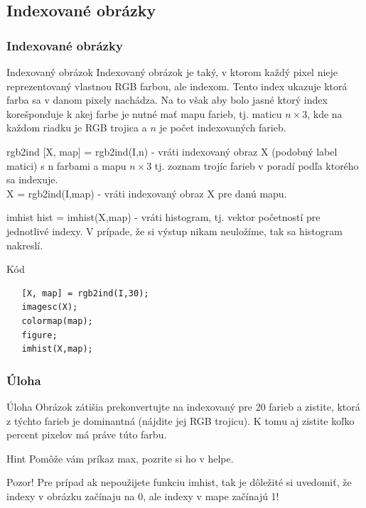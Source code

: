 \documentclass{beamer}
\begin{document}
\subsection{Indexované obrázky}
\begin{frame}[fragile]
\frametitle{Indexované obrázky}
  \begin{block}{Indexovaný obrázok}
  Indexovaný obrázok je taký, v ktorom každý pixel nieje reprezentovaný vlastnou RGB farbou, ale indexom. Tento index ukazuje ktorá farba sa v danom pixely nachádza. Na to však aby bolo jasné ktorý index korešponduje k akej farbe je nutné mať mapu farieb, tj. maticu $n \times 3$, kde na každom riadku je RGB trojica a $n$ je počet indexovaných farieb.
  \end{block} 
\end{frame}

\begin{frame}[fragile]

  \begin{block}{rgb2ind}
  [X, map] = rgb2ind(I,n) - vráti indexovaný obraz X (podobný label matici) s n farbami a mapu $n \times 3$ tj. zoznam trojíc farieb v poradí podľa ktorého sa indexuje. \\
    X = rgb2ind(I,map) - vráti indexovaný obraz X pre danú mapu.
  \end{block}   
  
  
    \begin{block}{imhist}
  hist = imhist(X,map) - vráti histogram, tj. vektor početností pre jednotlivé indexy. V prípade, že si výstup nikam neuložíme, tak sa histogram nakreslí.
  \end{block} 
  
  \begin{block}{Kód}
  \begin{verbatim}
   [X, map] = rgb2ind(I,30);
   imagesc(X);
   colormap(map);
   figure;
   imhist(X,map);\end{verbatim}
  \end{block} 
\end{frame}


\begin{frame}
\frametitle{Úloha}    
  \begin{block}{Úloha}
  Obrázok zátišia prekonvertujte na indexovaný pre 20 farieb a zistite, ktorá z týchto farieb je dominantná (nájdite jej RGB trojicu). K tomu aj zistite koľko percent pixelov má práve túto farbu.
  \end{block}   
  
  \begin{block}{Hint}
  Pomôže vám príkaz max, pozrite si ho v helpe.
  \end{block}  
  
  \begin{alertblock}{Pozor!}
  Pre prípad ak nepoužijete funkciu imhist, tak je dôležité si uvedomiť, že indexy v obrázku začínaju na 0, ale indexy v mape začínajú 1!
  \end{alertblock}   
\end{frame}
\end{document}
